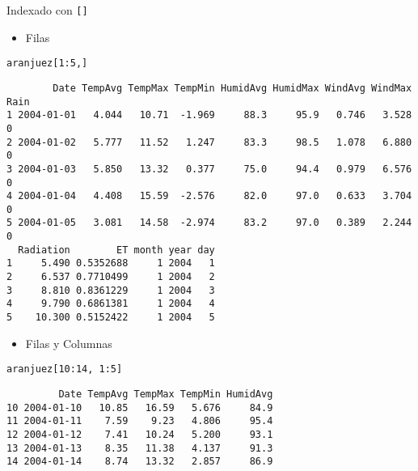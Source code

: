 \documentclass[aspectratio=169, usenames,svgnames,dvipsnames]{beamer}
\begin{document}
\begin{frame}[label={sec:orgc847b36},fragile]{Indexado con \texttt{[]}}
 \begin{itemize}
\item Filas
\end{itemize}
\lstset{language=r,label= ,caption= ,captionpos=b,numbers=none}
\begin{lstlisting}
aranjuez[1:5,]
\end{lstlisting}

\begin{verbatim}
        Date TempAvg TempMax TempMin HumidAvg HumidMax WindAvg WindMax Rain
1 2004-01-01   4.044   10.71  -1.969     88.3     95.9   0.746   3.528    0
2 2004-01-02   5.777   11.52   1.247     83.3     98.5   1.078   6.880    0
3 2004-01-03   5.850   13.32   0.377     75.0     94.4   0.979   6.576    0
4 2004-01-04   4.408   15.59  -2.576     82.0     97.0   0.633   3.704    0
5 2004-01-05   3.081   14.58  -2.974     83.2     97.0   0.389   2.244    0
  Radiation        ET month year day
1     5.490 0.5352688     1 2004   1
2     6.537 0.7710499     1 2004   2
3     8.810 0.8361229     1 2004   3
4     9.790 0.6861381     1 2004   4
5    10.300 0.5152422     1 2004   5
\end{verbatim}

\begin{itemize}
\item Filas y Columnas
\end{itemize}
\lstset{language=r,label= ,caption= ,captionpos=b,numbers=none}
\begin{lstlisting}
aranjuez[10:14, 1:5]
\end{lstlisting}

\begin{verbatim}
         Date TempAvg TempMax TempMin HumidAvg
10 2004-01-10   10.85   16.59   5.676     84.9
11 2004-01-11    7.59    9.23   4.806     95.4
12 2004-01-12    7.41   10.24   5.200     93.1
13 2004-01-13    8.35   11.38   4.137     91.3
14 2004-01-14    8.74   13.32   2.857     86.9
\end{verbatim}
\end{frame}
\end{document}
